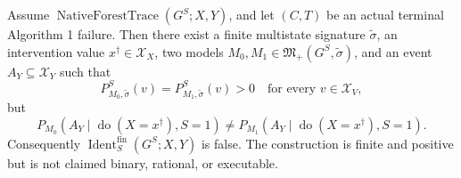 Assume \(\operatorname{NativeForestTrace}(G^S;X,Y)\), and let \((C,T)\) be an actual terminal Algorithm 1 failure. Then there exist a finite multistate signature \(\widetilde\sigma\), an intervention value \(x^\dagger\in\mathcal X_X\), two models \(M_0,M_1\in\mathfrak M_+(G^S,\widetilde\sigma)\), and an event \(A_Y\subseteq\mathcal X_Y\) such that
\[
 P_{M_0,\widetilde\sigma}^S(v)=P_{M_1,\widetilde\sigma}^S(v)>0
 \quad\text{for every }v\in\mathcal X_V,
\]
but
\[
 P_{M_0}(A_Y\mid\operatorname{do}(X=x^\dagger),S=1)
 \ne P_{M_1}(A_Y\mid\operatorname{do}(X=x^\dagger),S=1).
\]
Consequently \(\operatorname{Ident}^{\mathrm{fin}}_S(G^S;X,Y)\) is false. The construction is finite and positive but is not claimed binary, rational, or executable.
